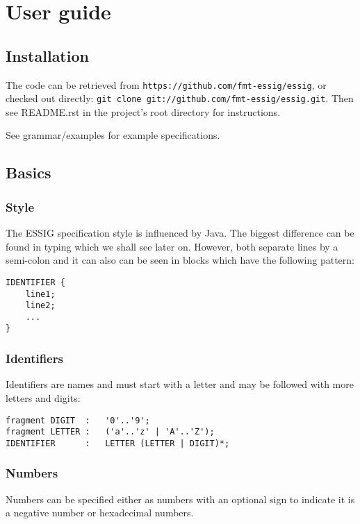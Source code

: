 \chapter{User guide}

\section{Installation}
The code can be retrieved from \texttt{https://github.com/fmt-essig/essig}, or
checked out directly: \texttt{git clone git://github.com/fmt-essig/essig.git}.
Then see README.rst in the project's root directory for instructions.

See grammar/examples for example specifications.

\section{Basics}
\subsection{Style}
The \ac{ESSIG} specification style is influenced by Java. The biggest
difference can be found in typing which we shall see later on. However, both
separate lines by a semi-colon and it can also can be seen in blocks which have
the following pattern:

\lstset{caption=Block specification pattern}
\begin{lstlisting}
IDENTIFIER {
	line1;
	line2;
	...
}
\end{lstlisting}


\subsection[IDENTIFIER]{Identifiers}
Identifiers are names and must start with a letter and may be followed with
more letters and digits:

\lstset{caption=Identifier specifation}
\begin{lstlisting}
fragment DIGIT	:	'0'..'9';
fragment LETTER	:	('a'..'z' | 'A'..'Z');
IDENTIFIER		:	LETTER (LETTER | DIGIT)*;
\end{lstlisting}

\subsection{Numbers}
Numbers can be specified either as numbers with an optional sign to indicate it
is a negative number or hexadecimal numbers.

